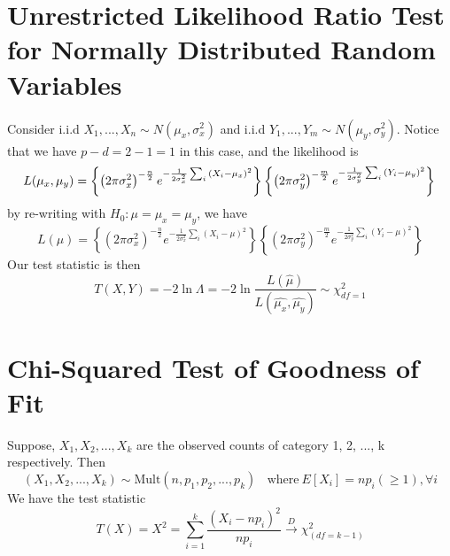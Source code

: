 \documentclass{article}
\begin{document}
\section{Unrestricted Likelihood Ratio Test for Normally Distributed Random Variables}
Consider i.i.d $X_1,...,X_n \sim N(\mu_x, \sigma_x^2)$ and i.i.d $Y_1,...,Y_m \sim N(\mu_y, \sigma_y^2)$. Notice that we have $p-d = 2 - 1 = 1$ in this case, and the likelihood is
\begin{equation*}
    L(\mu_x, \mu_y) = \left\{\left(2\pi \sigma_x^2\right)^{-\frac{n}{2}}e^{-\frac{1}{2\sigma_x^2}\sum_i{\left(X_i - \mu_x\right)^2}}\right\} \left\{\left(2\pi \sigma_y^2\right)^{-\frac{m}{2}}e^{-\frac{1}{2\sigma_y^2}\sum_i{\left(Y_i - \mu_y\right)^2}}\right\} \\
\end{equation*}    
by re-writing with $H_0: \mu = \mu_x = \mu_y$, we have
\begin{equation*}
    L(\mu) = \left\{\left(2\pi \sigma_x^2\right)^{-\frac{n}{2}}e^{-\frac{1}{2\sigma_x^2}\sum_i{\left(X_i - \mu\right)^2}}\right\} \left\{\left(2\pi \sigma_y^2\right)^{-\frac{m}{2}}e^{-\frac{1}{2\sigma_y^2}\sum_i{\left(Y_i - \mu\right)^2}}\right\}
\end{equation*}
Our test statistic is then
\begin{equation*}
    T(X,Y) = -2 \ln \Lambda = -2 \ln \frac{L(\hat{\mu})}{L(\hat{\mu_x}, \hat{\mu_y})} \sim \chi^2_{df = 1}
\end{equation*}

\section{Chi-Squared Test of Goodness of Fit}
Suppose, $X_1, X_2, ..., X_k$ are the observed counts of category 1, 2, ..., k respectively. Then
\begin{equation*}
    (X_1, X_2, ..., X_k) \sim \text{Mult}(n, p_1, p_2, ..., p_k)~~~~\text{where}~E[X_i] = np_i (\geq 1), \forall i
\end{equation*}
We have the test statistic
\begin{equation*}
    T(X) = X^2 = \sum_{i = 1}^k \frac{\left(X_i - np_i\right)^2}{np_i} \xrightarrow{D} \chi^2_{(df=k-1)}
\end{equation*}
\end{document}
